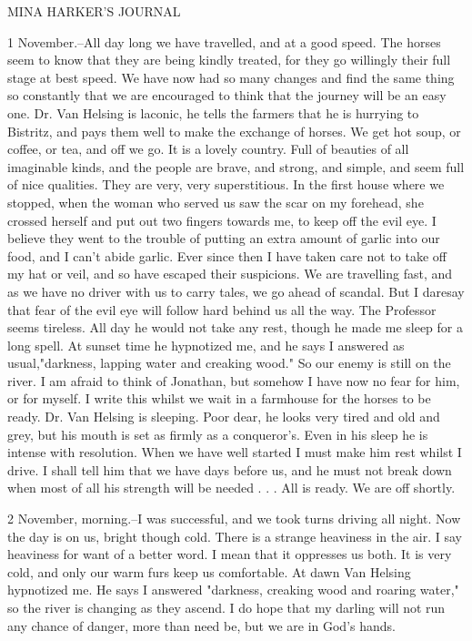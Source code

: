 MINA HARKER'S JOURNAL 

1 November.--All day long we have travelled, and at a good speed. The horses seem to know that they are being kindly treated, for they go willingly their full stage at best speed. We have now had so many changes and find the same thing so constantly that we are encouraged to think that the journey will be an easy one. Dr. Van Helsing is laconic, he tells the farmers that he is hurrying to Bistritz, and pays them well to make the exchange of horses. We get hot soup, or coffee, or tea, and off we go. It is a lovely country. Full of beauties of all imaginable kinds, and the people are brave, and strong, and simple, and seem full of nice qualities. They are very, very superstitious. In the first house where we stopped, when the woman who served us saw the scar on my forehead, she crossed herself and put out two fingers towards me, to keep off the evil eye. I believe they went to the trouble of putting an extra amount of garlic into our food, and I can't abide garlic. Ever since then I have taken care not to take off my hat or veil, and so have escaped their suspicions. We are travelling fast, and as we have no driver with us to carry tales, we go ahead of scandal. But I daresay that fear of the evil eye will follow hard behind us all the way. The Professor seems tireless. All day he would not take any rest, though he made me sleep for a long spell. At sunset time he hypnotized me, and he says I answered as usual,"darkness, lapping water and creaking wood." So our enemy is still on the river. I am afraid to think of Jonathan, but somehow I have now no fear for him, or for myself. I write this whilst we wait in a farmhouse for the horses to be ready. Dr. Van Helsing is sleeping. Poor dear, he looks very tired and old and grey, but his mouth is set as firmly as a conqueror's. Even in his sleep he is intense with resolution. When we have well started I must make him rest whilst I drive. I shall tell him that we have days before us, and he must not break down when most of all his strength will be needed . . . All is ready. We are off shortly. 

2 November, morning.--I was successful, and we took turns driving all night. Now the day is on us, bright though cold. There is a strange heaviness in the air. I say heaviness for want of a better word. I mean that it oppresses us both. It is very cold, and only our warm furs keep us comfortable. At dawn Van Helsing hypnotized me. He says I answered "darkness, creaking wood and roaring water," so the river is changing as they ascend. I do hope that my darling will not run any chance of danger, more than need be, but we are in God's hands. 

